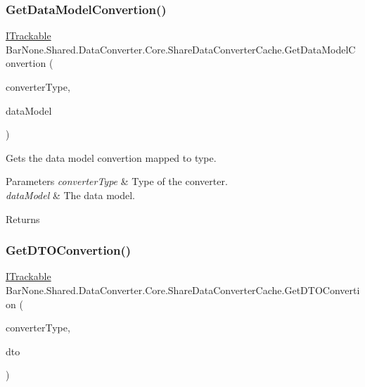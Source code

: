 \subsubsection{\texorpdfstring{Get\+Data\+Model\+Convertion()}{GetDataModelConvertion()}}
{\footnotesize\ttfamily \mbox{\hyperlink{interface_bar_none_1_1_shared_1_1_core_1_1_i_trackable}{I\+Trackable}} Bar\+None.\+Shared.\+Data\+Converter.\+Core.\+Share\+Data\+Converter\+Cache.\+Get\+Data\+Model\+Convertion (\begin{DoxyParamCaption}\item[{Type}]{converter\+Type,  }\item[{\mbox{\hyperlink{interface_bar_none_1_1_shared_1_1_core_1_1_i_trackable}{I\+Trackable}}}]{data\+Model }\end{DoxyParamCaption})}



Gets the data model convertion mapped to type. 


\begin{DoxyParams}{Parameters}
{\em converter\+Type} & Type of the converter.\\
\hline
{\em data\+Model} & The data model.\\
\hline
\end{DoxyParams}
\begin{DoxyReturn}{Returns}

\end{DoxyReturn}
\mbox{\label{class_bar_none_1_1_shared_1_1_data_converter_1_1_core_1_1_share_data_converter_cache_ab364147cf9d15c389fa88788e8b937e9}} 
\subsubsection{\texorpdfstring{Get\+D\+T\+O\+Convertion()}{GetDTOConvertion()}}
{\footnotesize\ttfamily \mbox{\hyperlink{interface_bar_none_1_1_shared_1_1_core_1_1_i_trackable}{I\+Trackable}} Bar\+None.\+Shared.\+Data\+Converter.\+Core.\+Share\+Data\+Converter\+Cache.\+Get\+D\+T\+O\+Convertion (\begin{DoxyParamCaption}\item[{Type}]{converter\+Type,  }\item[{\mbox{\hyperlink{interface_bar_none_1_1_shared_1_1_core_1_1_i_trackable}{I\+Trackable}}}]{dto }\end{DoxyParamCaption})}



